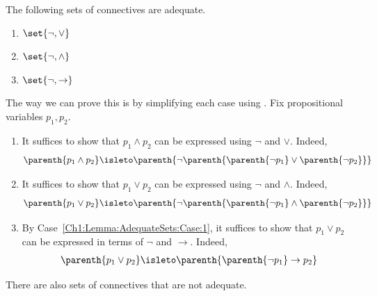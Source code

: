 \begin{boxexample}
    The following sets of connectives are adequate.
    \begin{enumerate}[noitemsep, label = \normalfont(\roman*)]
        \item\label{Ch1:Lemma:AdequateSets:Case:1} $\set{\neg, \lor}$
        \item $\set{\neg, \land}$
        \item $\set{\neg, \to}$
    \end{enumerate}
    The way we can prove this is by simplifying each case using . Fix propositional variables $p_1, p_2$.
    \begin{enumerate}[label = \normalfont(\roman*)]
        \item It suffices to show that $p_1 \land p_2$ can be expressed using $\neg$ and $\lor$. Indeed,
        \begin{align*}
            \parenth{p_1 \land p_2} \isleto \parenth{\neg\parenth{\parenth{\neg p_1} \lor \parenth{\neg p_2}}}
        \end{align*}
        
        \item It suffices to show that $p_1 \lor p_2$ can be expressed using $\neg$ and $\land$. Indeed,
        \begin{align*}
            \parenth{p_1 \lor p_2} \isleto \parenth{\neg\parenth{\parenth{\neg p_1} \land \parenth{\neg p_2}}}
        \end{align*}

        \item By Case~\ref{Ch1:Lemma:AdequateSets:Case:1}, it suffices to show that $p_1 \lor p_2$ can be expressed in terms of $\neg$ and $\to$. Indeed,
        \begin{align*}
            \parenth{p_1 \lor p_2} \isleto \parenth{\parenth{\neg p_1} \to p_2}
        \end{align*}
    \end{enumerate}
\end{boxexample}

There are also sets of connectives that are not adequate.

